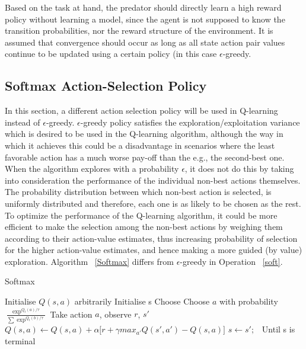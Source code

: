 \documentclass[11pt]{article}
\begin{document}
Based on the task at hand, the predator should directly learn a high reward policy without learning a model, since the agent is not supposed to know the transition probabilities, nor the reward structure of the environment. It is assumed that convergence should occur as long as all state action pair values continue to be updated using a certain policy (in this case $\epsilon$-greedy. 





\subsection{Softmax Action-Selection Policy}

In this section, a different action selection policy will be used in Q-learning instead of $\epsilon$-greedy. $\epsilon$-greedy policy satisfies the exploration/exploitation variance which is desired to be used in the Q-learning algorithm, although the way in which it achieves this could be a disadvantage in scenarios where the least favorable action has a much worse pay-off than the e.g., the second-best one. When the algorithm explores with a probability $\epsilon$, it does not do this by taking into consideration the performance of the individual non-best actions themselves. The probability distribution between which non-best action is selected, is uniformly distributed and therefore, each one is as likely to be chosen as the rest. To optimize the performance of the Q-learning algorithm, it could be more efficient to make the selection among the non-best actions by weighing them according to their action-value estimates, thus increasing probability of selection for the higher action-value estimates, and hence making a more guided (by value) exploration.
Algorithm ~\ref{Softmax} differs from $\epsilon$-greedy in Operation ~\ref{soft}.

\begin{algorithm}
\caption{Softmax}
\begin{algorithmic}[1]
\label{Softmax}
\STATE Initialise $Q(s,a)$ arbitrarily
\STATE Initialise s
\STATE Choose Choose $a$ with probability $\frac{\exp^{Q_t(a)/\tau}}{\sum{\exp^{Q_t(b)/\tau}}}$ \label{soft}
\STATE Take action $a$, observe $r$, $s'$
\STATE $Q(s,a) \leftarrow Q(s,a) + \alpha \lbrack r + \gamma max_{a'} Q(s',a') - Q(s,a)\rbrack$
\STATE $s \leftarrow s';$\
\ENDFOR
\STATE Until s is terminal
\ENDFOR
\end{algorithmic}
\end{algorithm}
\end{document}
